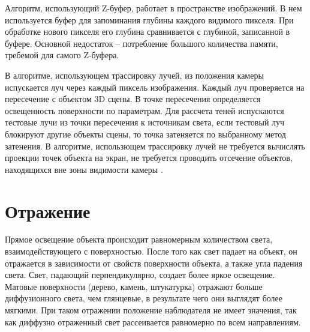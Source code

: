 Алгоритм, использующий Z-буфер, работает в пространстве изображений. В нем используется буфер для запоминания глубины каждого видимого пикселя. При обработке нового пикселя его глубина сравнивается с глубиной, записанной в буфере. Основной недостаток -- потребление большого количества памяти, требемой для самого Z-буфера. %



В алгоритме, использующем трассировку лучей, из положения камеры испускается луч через каждый пиксель изображения. Каждый луч проверяется на пересечение с объектом 3D сцены. В точке пересечения определяется освещенность поверхности по параметрам. Для рассчета теней испускаются тестовые лучи из точки пересечения к источникам света, если тестовый луч блокируют другие объекты сцены, то точка затеняется по выбранному метод затенения. %
В алгоритме, использющем трассировку лучей не требуется вычислять проекции точек объекта на экран, не требуется проводить отсечение объектов, находящихся вне зоны видимости камеры \cite{gabriel}.



\section{Отражение}
Прямое освещение объекта происходит равномерным количеством света, взаимодействующего с поверхностью. После того как свет падает на объект, он отражается в зависимости от свойств поверхности объекта, а также угла падения света. Свет, падающий перпендикулярно, создает более яркое освещение. Матовые поверхности (дерево, камень, штукатурка) отражают больше диффузионного света, чем глянцевые, в результате чего они выглядят более мягкими.
При таком отражении положение наблюдателя не имеет значения, так как диффузно отраженный свет рассеивается равномерно по всем направлениям.

